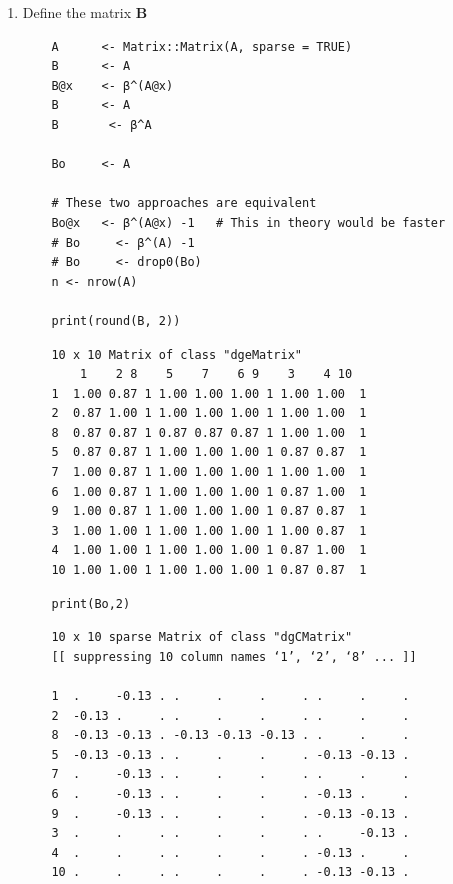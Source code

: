 \documentclass[11pt, twoside]{report}
\begin{document}
\begin{enumerate}
\item Define the matrix \(\mathbf{B}\)
\label{sec:orgde2e7a6}

\begin{tcolorbox}
    \begin{verbatim}
    A      <- Matrix::Matrix(A, sparse = TRUE)
    B      <- A
    B@x    <- β^(A@x)
    B      <- A
    B       <- β^A

    Bo     <- A

    # These two approaches are equivalent
    Bo@x   <- β^(A@x) -1   # This in theory would be faster
    # Bo     <- β^(A) -1
    # Bo     <- drop0(Bo)
    n <- nrow(A)

    print(round(B, 2))
    \end{verbatim}
\tcblower
    \begin{verbatim}
    10 x 10 Matrix of class "dgeMatrix"
        1    2 8    5    7    6 9    3    4 10
    1  1.00 0.87 1 1.00 1.00 1.00 1 1.00 1.00  1
    2  0.87 1.00 1 1.00 1.00 1.00 1 1.00 1.00  1
    8  0.87 0.87 1 0.87 0.87 0.87 1 1.00 1.00  1
    5  0.87 0.87 1 1.00 1.00 1.00 1 0.87 0.87  1
    7  1.00 0.87 1 1.00 1.00 1.00 1 1.00 1.00  1
    6  1.00 0.87 1 1.00 1.00 1.00 1 0.87 1.00  1
    9  1.00 0.87 1 1.00 1.00 1.00 1 0.87 0.87  1
    3  1.00 1.00 1 1.00 1.00 1.00 1 1.00 0.87  1
    4  1.00 1.00 1 1.00 1.00 1.00 1 0.87 1.00  1
    10 1.00 1.00 1 1.00 1.00 1.00 1 0.87 0.87  1
    \end{verbatim}
\end{tcolorbox}

\begin{tcolorbox}
    \begin{verbatim}
    print(Bo,2)
    \end{verbatim}

    \begin{verbatim}
    10 x 10 sparse Matrix of class "dgCMatrix"
    [[ suppressing 10 column names ‘1’, ‘2’, ‘8’ ... ]]

    1  .     -0.13 . .     .     .     . .     .     .
    2  -0.13 .     . .     .     .     . .     .     .
    8  -0.13 -0.13 . -0.13 -0.13 -0.13 . .     .     .
    5  -0.13 -0.13 . .     .     .     . -0.13 -0.13 .
    7  .     -0.13 . .     .     .     . .     .     .
    6  .     -0.13 . .     .     .     . -0.13 .     .
    9  .     -0.13 . .     .     .     . -0.13 -0.13 .
    3  .     .     . .     .     .     . .     -0.13 .
    4  .     .     . .     .     .     . -0.13 .     .
    10 .     .     . .     .     .     . -0.13 -0.13 .
    \end{verbatim}
\end{tcolorbox}


\end{enumerate}
\end{document}
